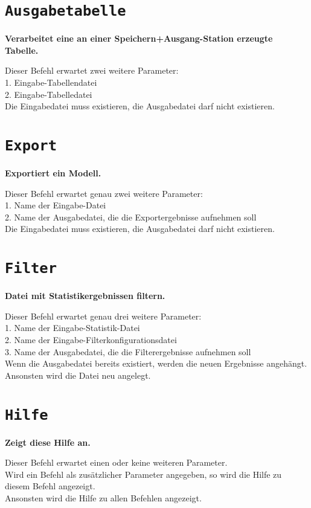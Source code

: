 \section{\texttt{Ausgabetabelle}}

\textbf{Verarbeitet eine an einer Speichern+Ausgang-Station erzeugte Tabelle.}

Dieser Befehl erwartet zwei weitere Parameter:\\
1. Eingabe-Tabellendatei\\
2. Eingabe-Tabelledatei\\
Die Eingabedatei muss existieren, die Ausgabedatei darf nicht existieren.

\section{\texttt{Export}}

\textbf{Exportiert ein Modell.}

Dieser Befehl erwartet genau zwei weitere Parameter:\\
1. Name der Eingabe-Datei\\
2. Name der Ausgabedatei, die die Exportergebnisse aufnehmen soll\\
Die Eingabedatei muss existieren, die Ausgabedatei darf nicht existieren.

\section{\texttt{Filter}}

\textbf{Datei mit Statistikergebnissen filtern.}

Dieser Befehl erwartet genau drei weitere Parameter:\\
1. Name der Eingabe-Statistik-Datei\\
2. Name der Eingabe-Filterkonfigurationsdatei\\
3. Name der Ausgabedatei, die die Filterergebnisse aufnehmen soll\\
Wenn die Ausgabedatei bereits existiert, werden die neuen Ergebnisse angehängt.\\
Ansonsten wird die Datei neu angelegt.

\section{\texttt{Hilfe}}

\textbf{Zeigt diese Hilfe an.}

Dieser Befehl erwartet einen oder keine weiteren Parameter.\\
Wird ein Befehl als zusätzlicher Parameter angegeben, so wird die Hilfe zu diesem Befehl angezeigt.\\
Ansonsten wird die Hilfe zu allen Befehlen angezeigt.

